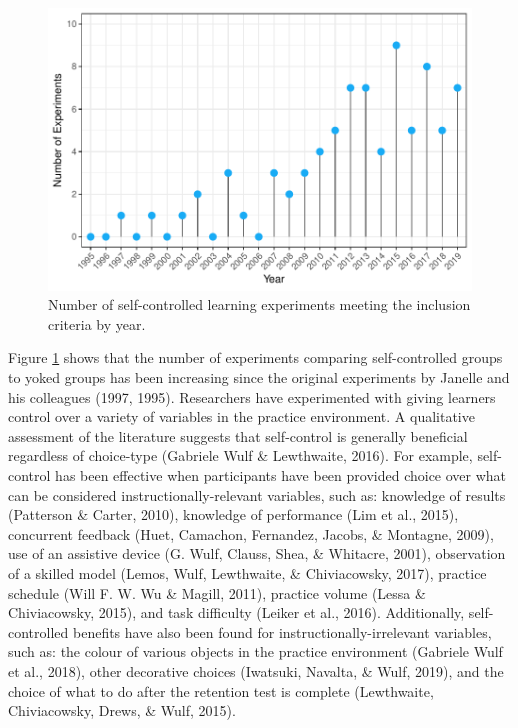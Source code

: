 \documentclass[
  english,
  man,floatsintext]{apa7}
\begin{document}
\begin{figure}

{\centering \includegraphics[height=0.51\textheight]{../../figs/fig1} 

}

\caption{Number of self-controlled learning experiments meeting the inclusion criteria by year.}\label{fig:fig1}
\end{figure}

Figure \ref{fig:fig1} shows that the number of experiments comparing self-controlled groups to yoked groups has been increasing since the original experiments by Janelle and his colleagues (1997, 1995). Researchers have experimented with giving learners control over a variety of variables in the practice environment. A qualitative assessment of the literature suggests that self-control is generally beneficial regardless of choice-type (Gabriele Wulf \& Lewthwaite, 2016). For example, self-control has been effective when participants have been provided choice over what can be considered instructionally-relevant variables, such as: knowledge of results (Patterson \& Carter, 2010), knowledge of performance (Lim et al., 2015), concurrent feedback (Huet, Camachon, Fernandez, Jacobs, \& Montagne, 2009), use of an assistive device (G. Wulf, Clauss, Shea, \& Whitacre, 2001), observation of a skilled model (Lemos, Wulf, Lewthwaite, \& Chiviacowsky, 2017), practice schedule (Will F. W. Wu \& Magill, 2011), practice volume (Lessa \& Chiviacowsky, 2015), and task difficulty (Leiker et al., 2016). Additionally, self-controlled benefits have also been found for instructionally-irrelevant variables, such as: the colour of various objects in the practice environment (Gabriele Wulf et al., 2018), other decorative choices (Iwatsuki, Navalta, \& Wulf, 2019), and the choice of what to do after the retention test is complete (Lewthwaite, Chiviacowsky, Drews, \& Wulf, 2015).
\end{document}
